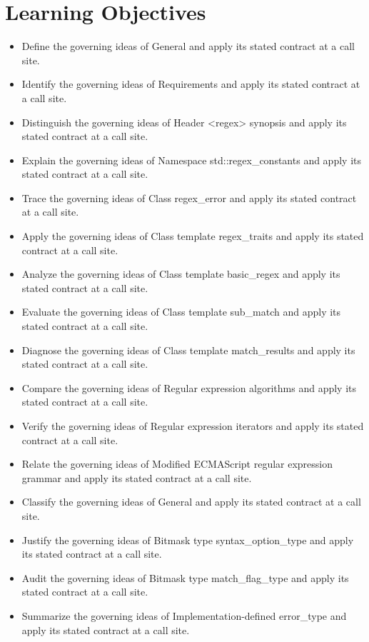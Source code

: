 \documentclass[11pt,letterpaper]{article}
\begin{document}
\section{Learning Objectives}
\begin{itemize}[label=\textcolor{CornellReferenceTeal}{$\blacktriangleright$}]
\item Define the governing ideas of General and apply its stated contract at a call site.
\item Identify the governing ideas of Requirements and apply its stated contract at a call site.
\item Distinguish the governing ideas of Header <regex> synopsis and apply its stated contract at a call site.
\item Explain the governing ideas of Namespace std::regex\_\allowbreak{}constants and apply its stated contract at a call site.
\item Trace the governing ideas of Class regex\_\allowbreak{}error and apply its stated contract at a call site.
\item Apply the governing ideas of Class template regex\_\allowbreak{}traits and apply its stated contract at a call site.
\item Analyze the governing ideas of Class template basic\_\allowbreak{}regex and apply its stated contract at a call site.
\item Evaluate the governing ideas of Class template sub\_\allowbreak{}match and apply its stated contract at a call site.
\item Diagnose the governing ideas of Class template match\_\allowbreak{}results and apply its stated contract at a call site.
\item Compare the governing ideas of Regular expression algorithms and apply its stated contract at a call site.
\item Verify the governing ideas of Regular expression iterators and apply its stated contract at a call site.
\item Relate the governing ideas of Modified ECMAScript regular expression grammar and apply its stated contract at a call site.
\item Classify the governing ideas of General and apply its stated contract at a call site.
\item Justify the governing ideas of Bitmask type syntax\_\allowbreak{}option\_\allowbreak{}type and apply its stated contract at a call site.
\item Audit the governing ideas of Bitmask type match\_\allowbreak{}flag\_\allowbreak{}type and apply its stated contract at a call site.
\item Summarize the governing ideas of Implementation-defined error\_\allowbreak{}type and apply its stated contract at a call site.
\end{itemize}
\end{document}
